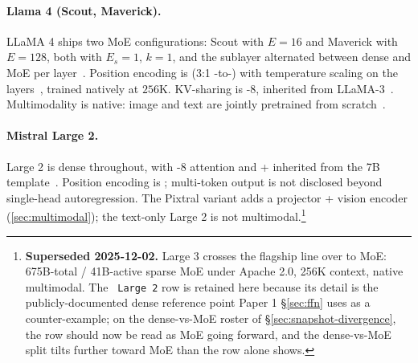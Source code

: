 \paragraph{Llama 4 (Scout, Maverick).}
LLaMA 4 ships two MoE configurations: Scout with $E = 16$ and
Maverick with $E = 128$, both with $E_s = 1$, $k = 1$, and the 
sublayer alternated between dense  and MoE per
layer~\citep[\S 2.1]{meta-llama4}. Position encoding is  (3:1
-to-) with temperature scaling on the 
layers~\citep[\S 2.1, \S 2.4]{meta-llama4}, trained natively at
$256\text{K}$. KV-sharing is -8, inherited from
LLaMA-3~\citep[\S 3.1]{meta-llama3}. Multimodality is native: image
and text are jointly pretrained from scratch~\citep[\S 2]{meta-llama4}.

\paragraph{Mistral Large 2.}
 Large 2 is dense  throughout, with -8 attention and
 +  inherited from the  7B
template~\citep[\S 2]{jiang2023}.
Position encoding is ; multi-token output is not disclosed beyond
single-head autoregression. The Pixtral variant adds a projector +
vision encoder (\cref{sec:multimodal}); the text-only  Large
2 is not multimodal.\footnote{\textbf{Superseded 2025-12-02.}
 Large 3 \citep{mistral-large3-2025} crosses the
 flagship line over to MoE: 675B-total / 41B-active sparse
MoE under Apache 2.0, 256K context, native multimodal. The
\texttt{ Large 2} row is retained here because its detail is
the publicly-documented dense reference point Paper 1 \S\ref{sec:ffn}
uses as a counter-example; on the dense-vs-MoE roster of
\S\ref{sec:snapshot-divergence}, the  row should now be read
as MoE going forward, and the dense-vs-MoE split tilts further
toward MoE than the row alone shows.}

